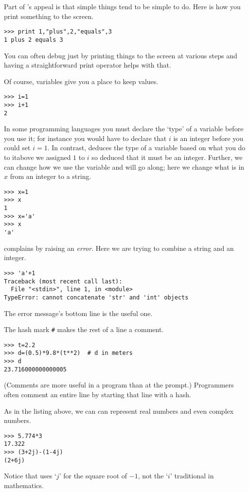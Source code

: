 Part of \python's appeal is that simple things tend to be simple to do.
Here is how you print something to the screen.
\begin{lstlisting}[style=python]
>>> print 1,"plus",2,"equals",3
1 plus 2 equals 3
\end{lstlisting}
You can often debug just by printing things to the screen at
various steps and having a straightforward print operator helps with that. 

Of course, variables give you a place to keep values.
\begin{lstlisting}[style=python]
>>> i=1
>>> i+1
2
\end{lstlisting}
In some programming languages you must declare the `type' of a variable
before you use it; for instance you would have to declare 
that $i$ is an integer before you could set $i=1$.
In contrast, \python{} deduces the type of a variable 
based on what you do to it\Dash above we assigned $1$ to $i$ 
so \python{} deduced that it must be an integer.
Further, we can change how we use the variable and \python{} will 
go along; here we change what is in $x$ from an integer to a string.
\begin{lstlisting}[style=python]
>>> x=1
>>> x
1
>>> x='a'
>>> x
'a'
\end{lstlisting}

\python{} complains by raising an \textit{error}.
Here we are trying to combine a string and an integer. 
\begin{lstlisting}[style=python]
>>> 'a'+1
Traceback (most recent call last):
  File "<stdin>", line 1, in <module>
TypeError: cannot concatenate 'str' and 'int' objects
\end{lstlisting}
The error message's bottom line is the useful one.

The hash mark \lstinline[style=inline]!#! makes the rest of a line a comment.
\begin{lstlisting}[style=python]
>>> t=2.2
>>> d=(0.5)*9.8*(t**2)  # d in meters
>>> d
23.716000000000005
\end{lstlisting}
(Comments are more useful in a program than at the prompt.)
Programmers often comment an entire line by starting 
that line with a hash. 

As in the listing above, we can can represent real 
numbers 
and even complex numbers.
\begin{lstlisting}[style=python]
>>> 5.774*3
17.322
>>> (3+2j)-(1-4j)
(2+6j)
\end{lstlisting}
Notice that \python{} uses `$j$' for the square
root of $-1$, not the `$i$' traditional in mathematics.

